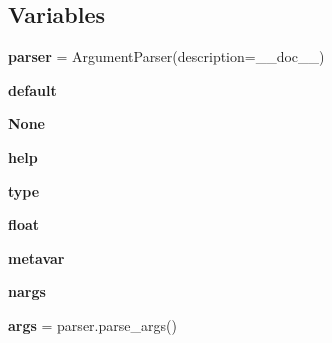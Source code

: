 \subsection*{Variables}
\begin{DoxyCompactItemize}
\item 
\mbox{\label{namespacepymavlink_1_1tools_1_1mavflighttime_a445972028a7b3011b1dc0a5fd7a9abc6}} 
{\bfseries parser} = Argument\+Parser(description=\+\_\+\+\_\+doc\+\_\+\+\_\+)
\item 
\mbox{\label{namespacepymavlink_1_1tools_1_1mavflighttime_ab75a1ed8e25c5245fac9b3e3dd9011d5}} 
{\bfseries default}
\item 
\mbox{\label{namespacepymavlink_1_1tools_1_1mavflighttime_a746257244d528c2f1fb646a7cd0669d0}} 
{\bfseries None}
\item 
\mbox{\label{namespacepymavlink_1_1tools_1_1mavflighttime_a41de75952c67c5e85441852a67862336}} 
{\bfseries help}
\item 
\mbox{\label{namespacepymavlink_1_1tools_1_1mavflighttime_ab9aeb28d56aee4aa9d335cded64123ec}} 
{\bfseries type}
\item 
\mbox{\label{namespacepymavlink_1_1tools_1_1mavflighttime_ab1fedea2ca1882ff7e060f44f8048885}} 
{\bfseries float}
\item 
\mbox{\label{namespacepymavlink_1_1tools_1_1mavflighttime_a41f141ce0eea4ef3e87cca685c6ea9f6}} 
{\bfseries metavar}
\item 
\mbox{\label{namespacepymavlink_1_1tools_1_1mavflighttime_a027b23446ac2b69d2941ded7c49d50c3}} 
{\bfseries nargs}
\item 
\mbox{\label{namespacepymavlink_1_1tools_1_1mavflighttime_a204d9242d26e222235baa22da7808820}} 
{\bfseries args} = parser.\+parse\+\_\+args()

\end{DoxyCompactItemize}
